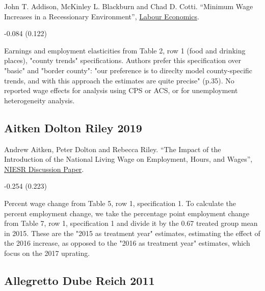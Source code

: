 \noindent John T. Addison, McKinley L. Blackburn and Chad D. Cotti. ``Minimum Wage Increases in a Recessionary Environment'', \href{https://doi.org/10.1016/j.labeco.2013.02.004}{Labour Economics}.

\vspace{0.7em}

 -0.084 (0.122)

\vspace{0.7em}

 Earnings and employment elasticities from Table 2, row 1 (food and drinking places), "county trends" specifications. Authors prefer this specification over "basic" and "border county": "our preference is to direclty model county-specific trends, and with this approach the estimates are quite precise" (p.35). No reported wage effects for analysis using CPS or ACS, or for unemployment heterogeneity analysis.

\subsection*{Aitken Dolton Riley 2019}
\vspace{-0.7em}

\noindent Andrew Aitken, Peter Dolton and Rebecca Riley. ``The Impact of the Introduction of the National Living Wage on Employment, Hours, and Wages'', \href{https://www.niesr.ac.uk/wp-content/uploads/2021/10/DP501.pdf}{NIESR Discussion Paper}.

\vspace{0.7em}

 -0.254 (0.223)

\vspace{0.7em}

 Percent wage change from Table 5, row 1, specification 1. To calculate the percent employment change, we take the percentage point employment change from Table 7, row 1, specification 1 and divide it by the 0.67 treated group mean in 2015. These are the "2015 as treatment year" estimates, estimating the effect of the 2016 increase, as opposed to the "2016 as treatment year" estimates, which focus on the 2017 uprating.

\subsection*{Allegretto Dube Reich 2011}
\vspace{-0.7em}

